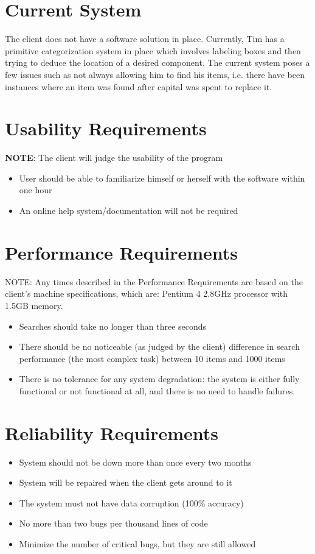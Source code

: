 \documentclass{article}
\begin{document}
\section{Current System}
The client does not have a software solution in place.  Currently, Tim has a primitive categorization system in place which involves labeling boxes and then trying to deduce the location of a desired component.  The current system poses a few issues such as not always allowing him to find his items, i.e. there have been instances where an item was found after capital was spent to replace it.

\section{Usability Requirements}
\textbf{NOTE}: The client will judge the usability of the program
\begin{itemize}
\item User should be able to familiarize himself or herself with the software within one hour
\item An online help system/documentation will not be required
\end{itemize}

\section{Performance Requirements}
NOTE: Any times described in the Performance Requirements are based on the client's machine specifications, which are: Pentium 4 2.8GHz processor with 1.5GB memory.
\begin{itemize}
\item Searches should take no longer than three seconds
\item There should be no noticeable (as judged by the client) difference in search performance (the most complex task) between 10 items and 1000 items
\item There is no tolerance for any system degradation: the system is either fully functional or not functional at all, and there is no need to handle failures.
\end{itemize}

\section{Reliability Requirements}
\begin{itemize}
\item System should not be down more than once every two months
\item System will be repaired when the client gets around to it
\item The system must not have data corruption (100\% accuracy)
\item No more than two bugs per thousand lines of code
\item Minimize the number of critical bugs, but they are still allowed
\end{itemize}
\end{document}
